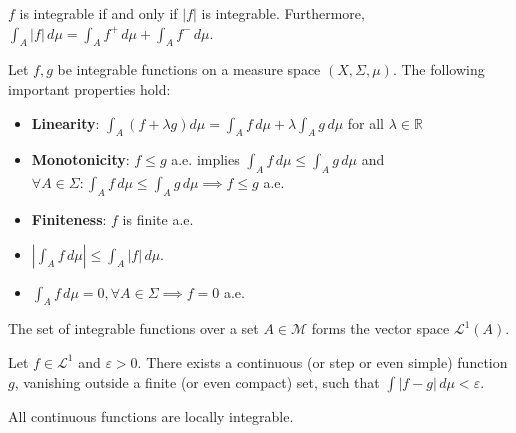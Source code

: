     \begin{property}\label{lebesgue:absolute_integrability}
        $f$ is integrable if and only if $|f|$ is integrable. Furthermore, $\int_A|f|\,d\mu = \int_Af^+\,d\mu + \int_Af^-\,d\mu$.
    \end{property}
    \begin{property}
        Let $f,g$ be integrable functions on a measure space $(X,\Sigma,\mu)$. The following important properties hold:
        \begin{itemize}
            \item\textbf{Linearity}: $\int_A(f+\lambda g)d\mu = \int_Af\,d\mu+\lambda\int_Ag\,d\mu$ for all $\lambda\in\mathbb{R}$
            \item\textbf{Monotonicity}: $f\leq g$ a.e. implies $\int_Af\,d\mu\leq\int_Ag\,d\mu$ and $\forall A\in\Sigma:\int_Af\,d\mu\leq\int_Ag\,d\mu\implies f\leq g$ a.e.
            \item\textbf{Finiteness}: $f$ is finite a.e.
            \item $|\int_Af\,d\mu|\leq\int_A|f|\,d\mu$.
            \item $\int_Af\,d\mu=0,\forall A\in\Sigma\implies f=0$ a.e.
        \end{itemize}
    \end{property}

    \begin{definition}
        The set of integrable functions over a set $A\in\mathcal{M}$ forms the vector space $\mathcal{L}^1(A)$.
    \end{definition}

    \begin{property}
        Let $f\in\mathcal{L}^1$ and $\varepsilon>0$. There exists a continuous (or step or even simple) function $g$, vanishing outside a finite (or even compact) set, such that $\int|f-g|\,d\mu<\varepsilon$.
    \end{property}

    \begin{example}
        All continuous functions are locally integrable.
    \end{example}

